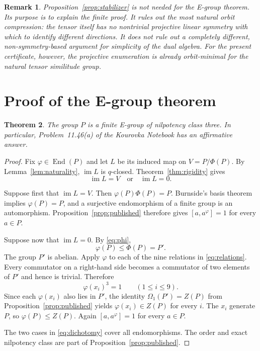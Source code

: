\documentclass[10pt,a4paper]{amsart}
\newtheorem{theorem}{Theorem}[section]
\newtheorem{remark}[theorem]{Remark}
\newcommand{\End}{\operatorname{End}}
\newcommand{\im}{\operatorname{im}}
\begin{document}
\begin{remark}\label{rem:orbit-no-go}
Proposition~\ref{prop:stabilizer} is not needed for the E-group theorem.
Its purpose is to explain the finite proof.  It rules out the most natural
orbit compression: the tensor itself has no nontrivial projective linear
symmetry with which to identify different directions.  It does not rule
out a completely different, non-symmetry-based argument for simplicity of
the dual algebra.  For the present certificate, however, the projective
enumeration is already orbit-minimal for the natural tensor similitude
group.
\end{remark}

\section{Proof of the E-group theorem}\label{sec:main}


\begin{theorem}\label{thm:main}
The group $P$ is a finite E-group of nilpotency class three.  In
particular, Problem~11.46(a) of the Kourovka Notebook has an affirmative
answer.
\end{theorem}

\begin{proof}
Fix $\varphi\in\End(P)$ and let $L$ be its induced map on
$V=P/\Phi(P)$.  By Lemma~\ref{lem:naturality}, $\im L$ is $q$-closed.
Theorem~\ref{thm:rigidity} gives
\begin{equation}\label{eq:dichotomy}
                             \im L=V\quad\text{or}\quad\im L=0.
\end{equation}

Suppose first that $\im L=V$.  Then
$\varphi(P)\Phi(P)=P$.  Burnside's basis theorem implies
$\varphi(P)=P$, and a surjective endomorphism of a finite group is an
automorphism.  Proposition~\ref{prop:published} therefore gives
$[a,a^\varphi]=1$ for every $a\in P$.

Suppose now that $\im L=0$.  By \eqref{eq:phi},
\[
                         \varphi(P)\leq\Phi(P)=P'.
\]
The group $P'$ is abelian.  Apply $\varphi$ to each of the nine relations
in \eqref{eq:relations}.  Every commutator on a right-hand side becomes a
commutator of two elements of $P'$ and hence is trivial.  Therefore
\[
                         \varphi(x_i)^3=1
                         \qquad(1\leq i\leq9).
\]
Since each $\varphi(x_i)$ also lies in $P'$, the identity
$\Omega_1(P')=Z(P)$ from Proposition~\ref{prop:published} yields
$\varphi(x_i)\in Z(P)$ for every $i$.  The $x_i$ generate $P$, so
$\varphi(P)\leq Z(P)$.  Again $[a,a^\varphi]=1$ for every $a\in P$.

The two cases in \eqref{eq:dichotomy} cover all endomorphisms.  The order
and exact nilpotency class are part of Proposition~\ref{prop:published}.
\end{proof}
\end{document}
